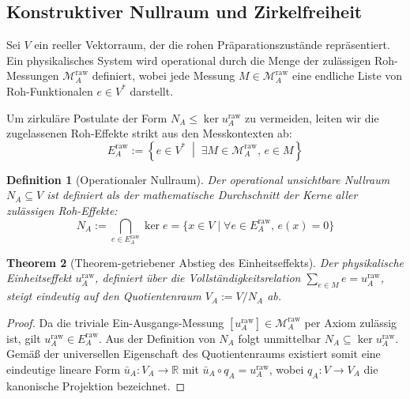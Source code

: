 \documentclass[11pt,a4paper]{article}
\newtheorem{theorem}{Theorem}[section]
\newtheorem{definition}[theorem]{Definition}
\begin{document}
\subsection{Konstruktiver Nullraum und Zirkelfreiheit}

Sei $V$ ein reeller Vektorraum, der die rohen Präparationszustände repräsentiert. Ein physikalisches System wird operational durch die Menge der zulässigen Roh-Messungen $\mathcal{M}_A^{\text{raw}}$ definiert, wobei jede Messung $M \in \mathcal{M}_A^{\text{raw}}$ eine endliche Liste von Roh-Funktionalen $e \in V^*$ darstellt.

Um zirkuläre Postulate der Form $N_A \le \ker u_A^{\text{raw}}$ zu vermeiden, leiten wir die zugelassenen Roh-Effekte strikt aus den Messkontexten ab:
\begin{equation}
E_A^{\text{raw}} := \left\{ e \in V^* \;\middle|\; \exists M \in \mathcal{M}_A^{\text{raw}},\, e \in M \right\}
\end{equation}

\begin{definition}[Operationaler Nullraum]
Der operational unsichtbare Nullraum $N_A \subseteq V$ ist definiert als der mathematische Durchschnitt der Kerne aller zulässigen Roh-Effekte:
\begin{equation}
N_A := \bigcap_{e \in E_A^{\text{raw}}} \ker e = \{ x \in V \mid \forall e \in E_A^{\text{raw}},\, e(x) = 0 \}
\end{equation}
\end{definition}

\begin{theorem}[Theorem-getriebener Abstieg des Einheitseffekts]
Der physikalische Einheitseffekt $u_A^{\text{raw}}$, definiert über die Vollständigkeitsrelation $\sum_{e \in M} e = u_A^{\text{raw}}$, steigt eindeutig auf den Quotientenraum $V_A := V / N_A$ ab.
\end{theorem}

\begin{proof}
Da die triviale Ein-Ausgangs-Messung $[u_A^{\text{raw}}] \in \mathcal{M}_A^{\text{raw}}$ per Axiom zulässig ist, gilt $u_A^{\text{raw}} \in E_A^{\text{raw}}$. Aus der Definition von $N_A$ folgt unmittelbar $N_A \subseteq \ker u_A^{\text{raw}}$. Gemäß der universellen Eigenschaft des Quotientenraums existiert somit eine eindeutige lineare Form $\bar{u}_A : V_A \to \mathbb{R}$ mit $\bar{u}_A \circ q_A = u_A^{\text{raw}}$, wobei $q_A : V \to V_A$ die kanonische Projektion bezeichnet.
\end{proof}
\end{document}
